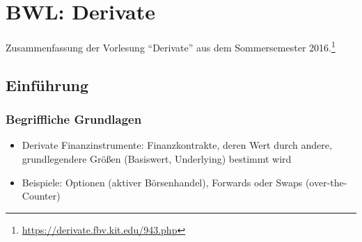 \chapter{BWL: Derivate}

Zusammenfassung der Vorlesung "`Derivate"' aus dem Sommersemester 2016.\footnote{\url{https://derivate.fbv.kit.edu/943.php}}

\section{Einführung}

\subsection{Begriffliche Grundlagen}
\begin{itemize}
	\item Derivate Finanzinstrumente: Finanzkontrakte, deren Wert durch andere, grundlegendere Größen (Basiswert, Underlying) bestimmt wird
	\item Beispiele: Optionen (aktiver Börsenhandel), Forwards oder Swaps (over-the-Counter)
\end{itemize}
